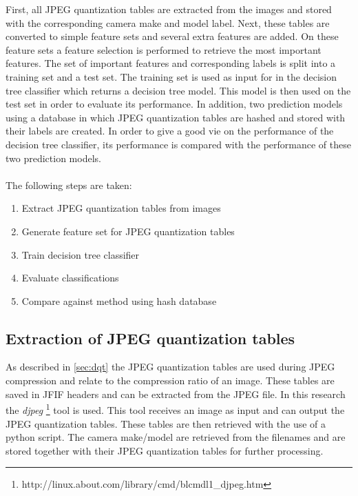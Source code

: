 First, all JPEG quantization tables are extracted from the images and stored with the corresponding camera make and model label. Next, these tables are converted to simple feature sets and several extra features are added. On these feature sets a feature selection is performed to retrieve the most important features. The set of important features and corresponding labels is split into a training set and a test set. The training set is used as input for in the decision tree classifier which returns a decision tree model. This model is then used on the test set in order to evaluate its performance. In addition, two prediction models using a database in which JPEG quantization tables are hashed and stored with their labels are created. In order to give a good vie on the performance of the decision tree classifier, its performance is compared with the performance of these two prediction models.
\\~\\
The following steps are taken:
\begin{enumerate}
\item Extract JPEG quantization tables from images
\item Generate feature set for JPEG quantization tables
\item Train decision tree classifier 
\item Evaluate classifications
\item Compare against method using hash database
\end{enumerate}


\subsection{Extraction of JPEG quantization tables}
As described in \autoref{sec:dqt} the JPEG quantization tables are used during JPEG compression and relate to the compression ratio of an image. These tables are saved in JFIF headers and can be extracted from the JPEG file. In this research the \textit{djpeg} \footnote{http://linux.about.com/library/cmd/blcmdl1\_djpeg.htm} tool is used. This tool receives an image as input and can output the JPEG quantization tables. These tables are then retrieved with the use of a python script. The camera make/model are retrieved from the filenames and are stored together with their JPEG quantization tables for further processing.

